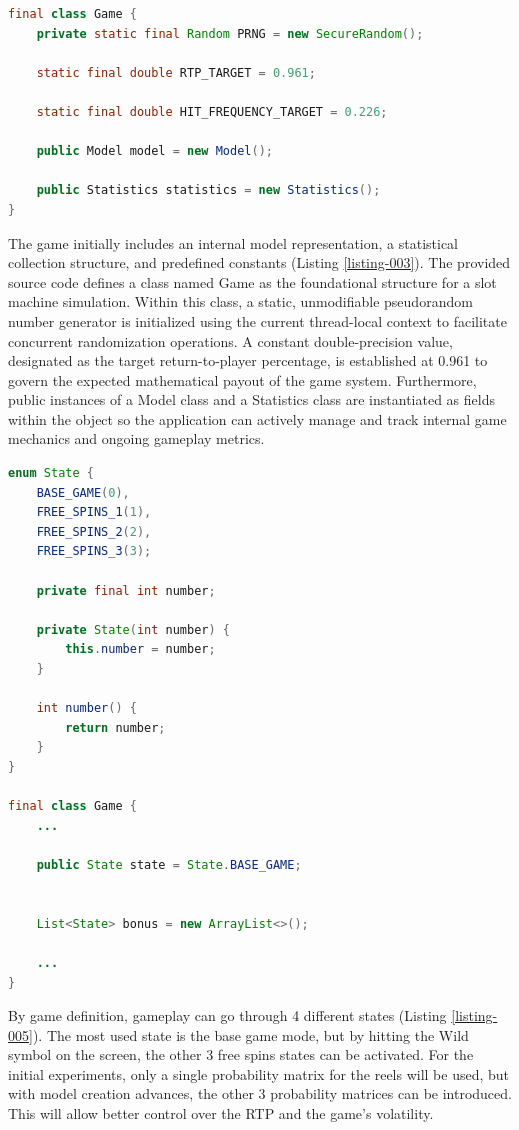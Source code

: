 \documentclass[12pt,twoside,openany]{book}
\begin{document}
\begin{lstlisting}[language=Java, caption={Game simulation class}, label=listing-003]
final class Game {
	private static final Random PRNG = new SecureRandom();

	static final double RTP_TARGET = 0.961;

	static final double HIT_FREQUENCY_TARGET = 0.226;

	public Model model = new Model();

	public Statistics statistics = new Statistics();
}
\end{lstlisting}

The game initially includes an internal model representation, a statistical collection structure, and predefined constants (Listing \ref{listing-003}). The provided source code defines a class named Game as the foundational structure for a slot machine simulation. Within this class, a static, unmodifiable pseudorandom number generator is initialized using the current thread-local context to facilitate concurrent randomization operations. A constant double-precision value, designated as the target return-to-player percentage, is established at 0.961 to govern the expected mathematical payout of the game system. Furthermore, public instances of a Model class and a Statistics class are instantiated as fields within the object so the application can actively manage and track internal game mechanics and ongoing gameplay metrics.

\begin{lstlisting}[language=Java, caption={Internal game states}, label=listing-005]
enum State {
	BASE_GAME(0),
	FREE_SPINS_1(1),
	FREE_SPINS_2(2),
	FREE_SPINS_3(3);

	private final int number;

	private State(int number) {
		this.number = number;
	}

	int number() {
		return number;
	}
}

final class Game {
	...

	public State state = State.BASE_GAME;


	List<State> bonus = new ArrayList<>();

	...
}

\end{lstlisting}

By game definition, gameplay can go through 4 different states (Listing \ref{listing-005}). The most used state is the base game mode, but by hitting the Wild symbol on the screen, the other 3 free spins states can be activated. For the initial experiments, only a single probability matrix for the reels will be used, but with model creation advances, the other 3 probability matrices can be introduced. This will allow better control over the RTP and the game's volatility.
\end{document}
